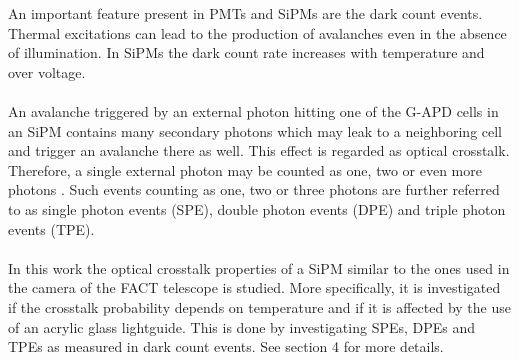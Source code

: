 \documentclass[10pt,a4paper]{article}
\begin{document}
\begin{multicols}{2}
An important feature present in PMTs and SiPMs are the dark count events. Thermal excitations can lead to the production of avalanches even in the absence of illumination. In SiPMs the dark count rate increases with temperature and over voltage\cite{avalanche}. \\ \\  \noindent
An avalanche triggered by an external photon hitting one of the G-APD cells in an SiPM contains many secondary photons which may leak to a neighboring cell and trigger an avalanche there as well. This effect is regarded as optical crosstalk. Therefore, a single external photon may be counted as one, two or even more photons \cite{gapd}. Such events counting as one, two or three photons are further referred to as single photon events (SPE), double photon events (DPE) and triple photon events (TPE). \\ \\  \noindent
In this work the optical crosstalk properties of a SiPM similar to the ones used in the camera of the FACT telescope is studied. More specifically, it is investigated if the crosstalk probability depends on temperature and if it is affected by the use of an acrylic glass lightguide. This is done by investigating SPEs, DPEs and TPEs as measured in dark count events. See section 4 for more details.


\end{multicols}
\end{document}
